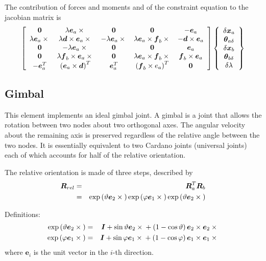 \documentclass[10pt,dvips,fleqn]{report}
\newcommand{\T}[1]{\boldsymbol{#1}}
\begin{document}
The contribution of forces and moments and of the constraint equation 
to the jacobian matrix is
\begin{equation}
	\sqbr{\matr{ccccc}{
		\T{0} & \lambda \T{e}_a \times{} & \T{0} & \T{0} & - \T{e}_a \\
		\lambda \T{e}_a \times{} & \lambda \T{d}\times\T{e}_a\times{} & 
			- \lambda \T{e}_a \times{} & \lambda \T{e}_a \times \T{f}_b\times{} &
			- \T{d}\times\T{e}_a \\
		\T{0} & - \lambda \T{e}_a \times{} & \T{0} & \T{0} & \T{e}_a \\
		\T{0} & \lambda \T{f}_b \times \T{e}_a \times{} &
			\T{0} & \lambda \T{e}_a\times\T{f}_b\times{} & \T{f}_b\times\T{e}_a \\
		- \T{e}_a^T & \plbr{\T{e}_a \times \T{d}}^T &
			\T{e}_a^T & \plbr{\T{f}_b\times{e}_a}^T & \T{0}
	}}\cubr{\cvvect{
		\delta\T{x}_a \\
		\T{\theta}_{a\delta} \\
		\delta\T{x}_b \\
		\T{\theta}_{b\delta} \\
		\delta\lambda
	}}
\end{equation}












\subsection{Gimbal}
This element implements an ideal gimbal joint.
A gimbal is a joint that allows the rotation between two nodes
about two orthogonal axes.
The angular velocity about the remaining axis is preserved regardless
of the relative angle between the two nodes.
It is essentially equivalent to two Cardano joints (universal joints)
each of which accounts for half of the relative orientation.

The relative orientation is made of three steps, described by
\begin{eqnarray*}
	\T{R}_{rel}
	& = & \T{R}_a^T \T{R}_b \\
	& = & \llk{exp}\plbr{\vartheta \T{e}_2 \times{}}
		\llk{exp}\plbr{\varphi \T{e}_1 \times{}}
		\llk{exp}\plbr{\vartheta \T{e}_2 \times{}}
\end{eqnarray*}

\noindent
Definitions:
\begin{eqnarray}
	\llk{exp}\plbr{\vartheta \T{e}_2 \times{}} & = &
		\T{I} + \sin\vartheta \T{e}_2\times{}
			+ \plbr{1 - \cos\vartheta}\T{e}_2\times\T{e}_2\times{}
		\label{eq:GIMBAL-EXP-THETA} \\
	\llk{exp}\plbr{\varphi \T{e}_1 \times{}} & = &
		\T{I} + \sin\varphi \T{e}_1\times{}
			+ \plbr{1 - \cos\varphi}\T{e}_1\times\T{e}_1\times{}
		\label{eq:GIMBAL-EXP-PHI}
\end{eqnarray}
where $\T{e}_i$ is the unit vector in the $i$-th direction.
\end{document}
